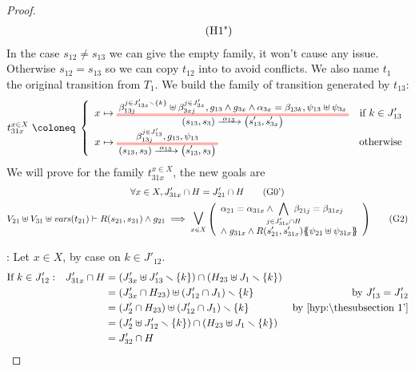 \documentclass{article}
\begin{document}
\begin{proof}
\begin{gather*}
{\begin{array}{l}
		\end{array}} \hyp{1"}
	\end{gather*}
	In the case \(s_{12} \neq s_{13}\) we can give the empty family, it won't cause any issue.
	Otherwise \(s_{12} = s_{13}\) so we can copy \(t_{12}\) into  to avoid conflicts.
	We also name \(t_1\) the original transition from \(T_1\).
	We build the family of transition generated by \(t_{13}\):
	\[ t_{31x}^{x \in X} \defobject \choice{
		x \mapsto \OT{\mpar{s_{13}, s_3}}{\mpar{s'_{13}, s'_{3x}}}{\alpha_{13}}{\beta_{13j}^{j \in J'_{13x} \setminus \mbrc{k}} \uplus \beta_{3xj}^{j \in J'_{3x}}}{g_{13} \wedge g_{3x} \wedge \alpha_{3x} = \beta_{13k}}{\psi_{13} \uplus \psi_{3x}} & \text{if } k \in J'_{13} \\
		x \mapsto \OT{\mpar{s_{13}, s_3}}{\mpar{s'_{13}, s_3}}{\alpha_{13}}{\beta_{13j}^{j \in J'_{13}}}{g_{13}}{\psi_{13}} & \text{otherwise}
	} \]
	We will prove  for the family \(t_{31x}^{x \in X}\), the new goals are
	\begin{gather}
		\forall x \in X, J'_{31x} \cap H = J'_{21} \cap H \goal{0'} \\
		V_{21} \uplus V_{31} \uplus \fvars{t_{21}} \vdash R\mpar{s_{21}, s_{31}} \wedge g_{21} \implies \operatorname*{\bigsymb{\bigvee}}_{x \in X} \mpar{\everymath{\displaystyle}\begin{array}{l}
			\alpha_{21} = \alpha_{31x} \wedge \bigwedge_\subbox{j \in J'_{31x} \cap H} \beta_{21j} = \beta_{31xj} \\[12pt]
			\nwedge g_{31x} \wedge R\mpar{s'_{21}, s'_{31x}}\psubst{\psi_{21} \uplus \psi_{31x}}
		\end{array}} \goal{2}
	\end{gather}
\item[\goal{0'}:] Let \(x \in X\), by case on \(k \in J'_{12}\).
	\begin{align*}
		\text{If } k \in J'_{12}: && J'_{31x} \cap H & = \mpar{J'_{3x} \uplus J'_{13} \setminus \mbrc{k}} \cap \mpar{H_{23} \uplus J_1 \setminus \mbrc{k}} \\
		&&& = \mpar{J'_{3x} \cap H_{23}} \uplus \mpar{J'_{12} \cap J_1} \setminus \mbrc{k} & \text{by } J'_{13} = J'_{12} \\
		&&& = \mpar{J'_2 \cap H_{23}} \uplus \mpar{J'_{12} \cap J_1} \setminus \mbrc{k} & \text{by \hyp{1'}} \\
		&&& = \mpar{J'_2 \uplus J'_{12} \setminus \mbrc{k}} \cap \mpar{H_{23} \uplus J_1 \setminus \mbrc{k}} \\
		&&& = J'_{32} \cap H \\

\end{align*}
\end{proof}
\end{document}
